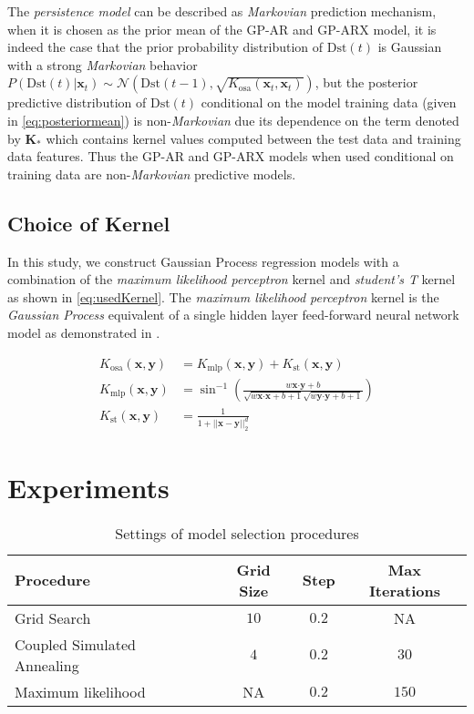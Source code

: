 The \emph{persistence model} can be described as \emph{Markovian} prediction mechanism, when it is chosen as the prior mean of the GP-AR and GP-ARX model, it is indeed the case that the prior probability distribution of $ \mathrm{Dst}(t)$ is Gaussian with a strong \emph{Markovian} behavior $P(\mathrm{Dst}(t)|\mathbf{x}_t) \sim \mathcal{N}(\mathrm{Dst}(t-1), \sqrt{K_{\text{osa}}(\mathbf{x}_t, \mathbf{x}_t)})$, but the posterior predictive distribution of $\mathrm{Dst}(t)$ conditional on the model training data (given in \cref{eq:posteriormean}) is non-\emph{Markovian} due its dependence on the term denoted by $\mathbf{K}_{*}$ which contains kernel values computed between the test data and training data features. Thus the GP-AR and GP-ARX models when used conditional on training data are non-\emph{Markovian} predictive models.

\subsection{Choice of Kernel}

In this study, we construct Gaussian Process regression models with a combination of the \emph{maximum likelihood perceptron} kernel and \emph{student's T} kernel as shown in \cref{eq:usedKernel}. The \emph{maximum likelihood perceptron} kernel is the \emph{Gaussian Process} equivalent of a single hidden layer feed-forward neural network model as demonstrated in \citet{Neal:1996:BLN:525544}.

\begin{align}
    K_{\text{osa}}(\mathbf{x}, \mathbf{y}) & = K_{\text{mlp}}(\mathbf{x}, \mathbf{y}) + K_{\text{st}}(\mathbf{x}, \mathbf{y}) \label{eq:usedKernel} \\
    K_{\text{mlp}}(\mathbf{x}, \mathbf{y}) & = \sin^{-1}\left(\frac{w\mathbf{x}\boldsymbol{\cdot} \mathbf{y} + b}{\sqrt{w\mathbf{x}\boldsymbol{\cdot} \mathbf{x} + b + 1} \sqrt{w\mathbf{y}\boldsymbol{\cdot} \mathbf{y} + b + 1}}\right) \\
    K_{\text{st}}(\mathbf{x}, \mathbf{y}) & = \frac{1}{1 + ||\mathbf{x} - \mathbf{y}||_{2}^d}
\end{align}

\section{Experiments} \label{sec:modeltraining}

\begin{table}[ht]
    \centering
    \caption{Settings of model selection procedures}
    \begin{tabular}{l c c c}
    \hline
    \textbf{Procedure} & \textbf{Grid Size} & \textbf{Step} & \textbf{Max Iterations} \\
    \hline
    Grid Search & $10$ & $0.2$ & NA \\
    Coupled Simulated Annealing & $4$ & $0.2$ & $30$ \\
    Maximum likelihood & NA & $0.2$ & $150$\\
    \hline
    \end{tabular}
    \label{table:modelselection}
\end{table}

